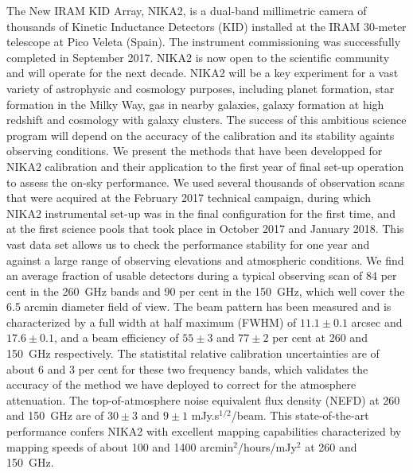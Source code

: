 \documentclass{aa}
\begin{document}
   \abstract
       {The New IRAM KID Array, NIKA2, is a dual-band millimetric
         camera of thousands of Kinetic
         Inductance Detectors (KID) installed at the IRAM 30-meter
         telescope at Pico Veleta (Spain). The instrument
         commissioning  was successfully completed in September
         2017. NIKA2 is now open to the scientific community and will
         operate for the next decade. NIKA2 will be a key experiment for a vast variety of
         astrophysic and cosmology purposes, including planet
         formation, star formation in the Milky Way, gas in
         nearby galaxies, galaxy formation at high redshift and
         cosmology with galaxy clusters. The success of this ambitious science
         program will depend on the accuracy of the calibration and
         its stability againts observing conditions.}
       {We present the methods that have been developped for NIKA2
         calibration and their application to the first year of final
         set-up operation to assess the on-sky performance.}
       {We used several
         thousands of observation scans that were acquired at the February
         2017 technical campaign, during which NIKA2 instrumental set-up was
         in the final configuration for the first time,
         and at the first science pools that took place in October 2017 and
         January 2018. This vast data set allows us to check the performance
         stability for one year and against a large range of observing
         elevations and atmospheric conditions. %
       }
       {We find an average fraction of usable detectors during a
         typical observing scan of 84 per cent in the 260~GHz bands and 90 per cent in the
         150~GHz, which well cover the 6.5 arcmin diameter field of
         view. The beam pattern has been measured and is characterized
         by a full width at half maximum (FWHM) of $11.1\pm0.1$ arcsec
         and $17.6 \pm 0.1$, and a beam efficiency of $55\pm 3$ and
         $77\pm 2$ per cent at 260 and 150~GHz respectively. The
         statistital relative calibration uncertainties are of about 6
       and 3 per cent for these two frequency bands, which validates
       the accuracy of the method we have deployed to correct for the
       atmosphere attenuation. The top-of-atmosphere noise equivalent
       flux density (NEFD) at 260 and 150~GHz are of $30 \pm 3$ and
       $9 \pm 1$ mJy.s$^{1/2}$/beam. This state-of-the-art performance
       confers NIKA2 with excellent mapping capabilities characterized
       by mapping speeds of about 100 and 1400
       arcmin$^2$/hours/mJy$^2$ at 260 and 150~GHz.}
       {}
\end{document}
